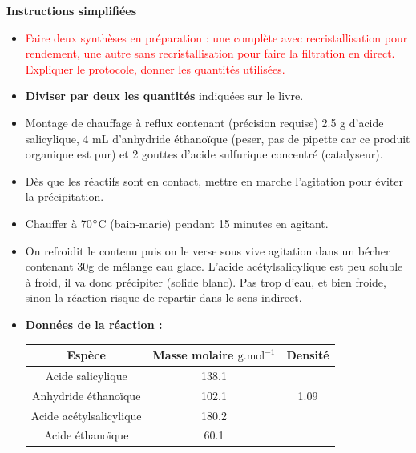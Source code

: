 \documentclass[11pt,a4paper]{report}
\begin{document}
\textbf{Instructions simplifiées}
\begin{itemize}
	\item \textcolor{red}{Faire deux synthèses en préparation : une complète avec recristallisation pour rendement, une autre sans recristallisation pour faire la filtration en direct. Expliquer le protocole, donner les quantités utilisées.}
	\item \textbf{Diviser par deux les quantités} indiquées sur le livre.
	\item Montage de chauffage à reflux contenant (précision requise) 2.5 g d'acide salicylique, 			4 mL d'anhydride éthanoïque (peser, pas de pipette car ce produit organique est pur) et 2 			gouttes d'acide sulfurique concentré (catalyseur).
	\item Dès que les réactifs sont en contact, mettre en marche l'agitation pour éviter la 				précipitation.
	\item Chauffer à 70$\degree$C (bain-marie) pendant 15 minutes en agitant.
	\item On refroidit le contenu puis on le verse sous vive agitation dans un bécher 
	contenant 30g de mélange eau glace. L'acide acétylsalicylique est peu soluble à froid, il va 		donc précipiter (solide blanc). Pas trop d'eau, et bien froide, sinon la réaction risque de 		repartir dans le sens indirect.\\
	
	\item \textbf{Données de la réaction :}\\
	\begin{center}
		\begin{tabular}{|c|c|c|}
 		\hline
  			Espèce & {Masse molaire} $\text{g}.\text{mol}^{-1}$ & Densité\\
  		\hline
  		\hline
  			Acide salicylique & 138.1 &\\
  		\hline 
  			Anhydride éthanoïque & 102.1 & 1.09\\
  		\hline
  			Acide acétylsalicylique & 180.2 &\\
  		\hline
   			Acide éthanoïque & 60.1 &\\
  		\hline
		\end{tabular}
	\end{center}
\end{itemize}
\end{document}
